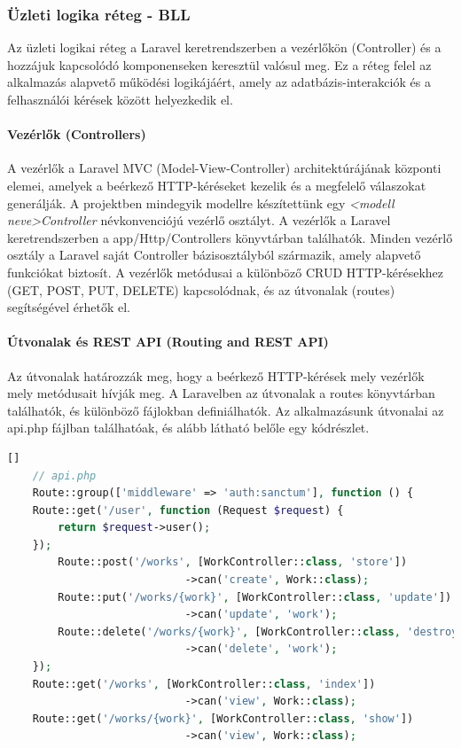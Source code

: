 \subsubsection{Üzleti logika réteg - BLL}

Az üzleti logikai réteg a Laravel keretrendszerben a vezérlőkön (Controller) és a hozzájuk kapcsolódó komponenseken keresztül valósul meg. Ez a réteg felel az alkalmazás alapvető működési logikájáért, amely az adatbázis-interakciók és a felhasználói kérések között helyezkedik el.
\paragraph{Vezérlők (Controllers)}

A vezérlők a Laravel MVC (Model-View-Controller) architektúrájának központi elemei, amelyek a beérkező HTTP-kéréseket kezelik és a megfelelő válaszokat generálják.
A projektben mindegyik modellre készítettünk egy \textsl{<modell neve>Controller} névkonvenciójú vezérlő osztályt. A vezérlők a Laravel keretrendszerben a app/Http/Controllers könyvtárban találhatók. Minden vezérlő osztály a Laravel saját Controller bázisosztályból származik, amely alapvető funkciókat biztosít. A vezérlők metódusai a különböző CRUD HTTP-kérésekhez (GET, POST, PUT, DELETE) kapcsolódnak, és az útvonalak (routes) segítségével érhetők el.


\paragraph{Útvonalak és REST API (Routing and REST API)}

Az útvonalak határozzák meg, hogy a beérkező HTTP-kérések mely vezérlők mely metódusait hívják meg. A Laravelben az útvonalak a routes könyvtárban találhatók, és különböző fájlokban definiálhatók. Az alkalmazásunk útvonalai az api.php fájlban találhatóak, és alább látható belőle egy kódrészlet.
\begin{lstlisting}[language=php][]
    // api.php
    Route::group(['middleware' => 'auth:sanctum'], function () {
    Route::get('/user', function (Request $request) {
        return $request->user();
    });
        Route::post('/works', [WorkController::class, 'store'])
                            ->can('create', Work::class);
        Route::put('/works/{work}', [WorkController::class, 'update'])
                            ->can('update', 'work');
        Route::delete('/works/{work}', [WorkController::class, 'destroy'])
                            ->can('delete', 'work');
    });
    Route::get('/works', [WorkController::class, 'index'])
                            ->can('view', Work::class);
    Route::get('/works/{work}', [WorkController::class, 'show'])
                            ->can('view', Work::class);
\end{lstlisting}

